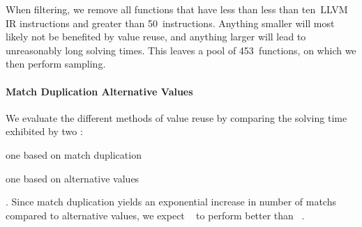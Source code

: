 When filtering, we remove all \glspl{function} that have less than less
than ten~\gls{LLVM} \gls{IR} \glspl{instruction} and greater than
\num{50}~\glspl{instruction}.
%
Anything smaller will most likely not be benefited by \gls{value reuse}, and
anything larger will lead to unreasonably long solving times.
%
This leaves a pool of \num{453}~\glspl{function}, on which we then perform
sampling.


\paragraph{Match Duplication \versus Alternative Values}

We evaluate the different methods of \gls{value reuse} by comparing the solving
time exhibited by two :
%
\begin{modelList}
  \item {}
    one based on \gls{match duplication}
  \item {}
    one based on \glspl{alternative value}
\end{modelList}.
%
Since \gls{match duplication} yields an exponential increase in number of
\glspl{match} compared to \glspl{alternative value}, we expect
~ to perform better than
~.



